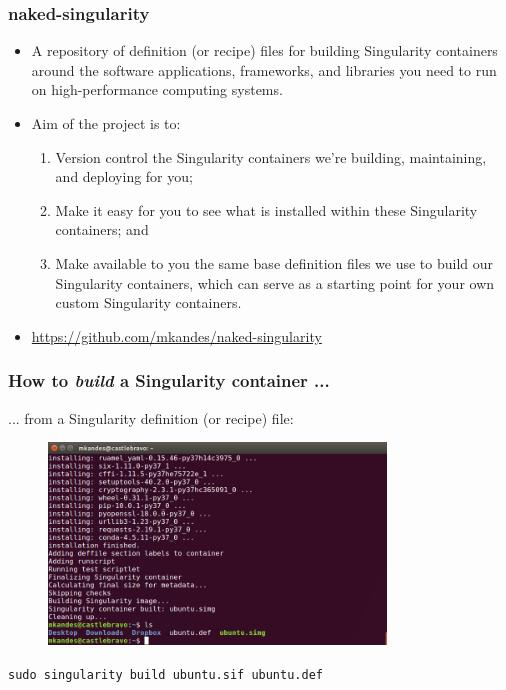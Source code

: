 \documentclass{beamer}
\begin{document}
\begin{frame}
   \frametitle{naked-singularity}
   \begin{itemize}
      \setlength\itemsep{1.0em}
      \item A repository of definition (or recipe) files for building
         Singularity containers around the software applications,
         frameworks, and libraries you need to run on high-performance
         computing systems.
      \item Aim of the project is to: \\
      \begin{enumerate}
         \setlength\itemsep{1.0em}
         \item Version control the Singularity containers we're
            building, maintaining, and deploying for you;
         \item Make it easy for you to see what is installed within
            these Singularity containers; and
         \item Make available to you the same base definition files we
            use to build our Singularity containers, which can serve as
            a starting point for your own custom Singularity containers.
      \end{enumerate}
      \item \url{https://github.com/mkandes/naked-singularity}
   \end{itemize}
\end{frame}

\begin{frame}
   \frametitle{How to \textit{build} a Singularity container ...}
   ... from a Singularity definition (or recipe) file:
   \begin{figure}[htbp]
      \includegraphics[width=0.8\textwidth]{images/singularity-build-deffile-end.png}
   \end{figure}
   \lstinline{sudo singularity build ubuntu.sif ubuntu.def}
\end{frame}
\end{document}
